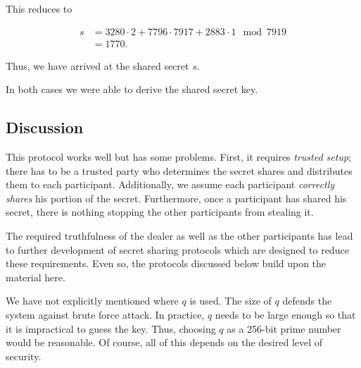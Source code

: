 \begin{example}
\begin{itemize}
\noindent
This reduces to

\begin{align}
    s &= 3280\cdot2 + 7796\cdot7917 + 2883\cdot1 \mod 7919
        \nonumber\\
    &= 1770.
\end{align}

\noindent
Thus, we have arrived at the \gls{shared secret} $s$.
\end{itemize}

In both cases we were able to derive the \gls{shared secret} key.
\end{example}

\subsection{Discussion}
\label{ssec:ss_shamir_discussion}

This protocol works well but has some problems.
First, it requires \emph{trusted setup}; there has to be a trusted
party who determines the secret shares and distributes them
to each participant.
Additionally, we assume each participant \emph{correctly shares}
his portion of the secret.
Furthermore, once a participant has shared his secret,
there is nothing stopping the other participants from stealing it.

The required truthfulness of the dealer as well as the other participants
has lead to further development of secret sharing protocols
which are designed to reduce these requirements.
Even so, the protocols discussed below build upon the material here.

We have not explicitly mentioned where $q$ is used.
The size of $q$ defends the system against brute force attack.
In practice, $q$ needs to be large enough so that it is impractical
to guess the key.
Thus, choosing $q$ as a 256-bit prime number would be reasonable.
Of course, all of this depends on the desired level of security.
